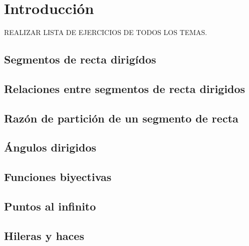 \chapter{Introducción}


REALIZAR LISTA DE EJERCICIOS DE TODOS LOS TEMAS.


\section{Segmentos de recta dirigídos}

\section{Relaciones entre segmentos de recta dirigidos}

\section{Razón de partición de un segmento de recta}

\section{Ángulos dirigidos}

\section{Funciones biyectivas}

\section{Puntos al infinito}

\section{Hileras y haces}



